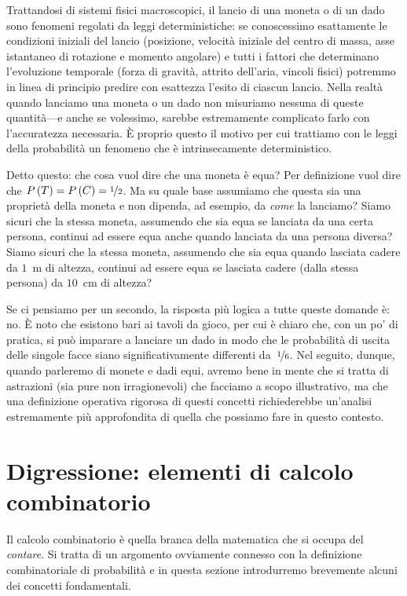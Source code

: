 Trattandosi di sistemi fisici macroscopici, il lancio di una moneta o di un dado
sono fenomeni regolati da leggi deterministiche: se conoscessimo esattamente
le condizioni iniziali del lancio (posizione, velocità iniziale del centro
di massa, asse istantaneo di rotazione e momento angolare) e tutti i fattori che
determinano l'evoluzione temporale (forza di gravità, attrito dell'aria,
vincoli fisici) potremmo in linea di principio predire con esattezza l'esito di
ciascun lancio. Nella realtà quando lanciamo una moneta o un dado non
misuriamo nessuna di queste quantità---e anche se volessimo, sarebbe
estremamente complicato farlo con l'accuratezza necessaria. \`E proprio questo
il motivo per cui trattiamo con le leggi della probabilità un fenomeno che
è intrinsecamente deterministico.

Detto questo: che cosa vuol dire che una moneta è equa? Per definizione
vuol dire che $\displaystyle P\left(T\right) = \displaystyle P\left(C\right) = \nicefrac{1}{2}$. Ma su quale base
assumiamo che questa sia una proprietà della moneta e non dipenda, ad esempio,
da \emph{come} la lanciamo? Siamo sicuri che la stessa moneta, assumendo che
sia equa se lanciata da una certa persona, continui ad essere equa anche
quando lanciata da una persona diversa? Siamo sicuri che la stessa moneta,
assumendo che sia equa quando lasciata cadere da $1$~m di altezza, continui
ad essere equa se lasciata cadere (dalla stessa persona) da $10$~cm di altezza?

Se ci pensiamo per un secondo, la risposta più logica a tutte queste domande
è: no. \`E noto che esistono bari ai tavoli da gioco, per cui è chiaro che,
con un po' di pratica, si può imparare a lanciare un dado in modo che le
probabilità di uscita delle singole facce siano significativamente differenti
da~$\nicefrac{1}{6}$. Nel seguito, dunque, quando parleremo di monete e dadi
equi, avremo bene in mente che si tratta di astrazioni (sia pure non
irragionevoli) che facciamo a scopo illustrativo, ma che una definizione
operativa rigorosa di questi concetti richiederebbe un'analisi estremamente
più approfondita di quella che possiamo fare in questo contesto.


\section{Digressione: elementi di calcolo combinatorio}

Il calcolo combinatorio è quella branca della matematica che si occupa del
\emph{contare}. Si tratta di un argomento ovviamente connesso con la
definizione combinatoriale di probabilità e in questa sezione introdurremo
brevemente alcuni dei concetti fondamentali.


